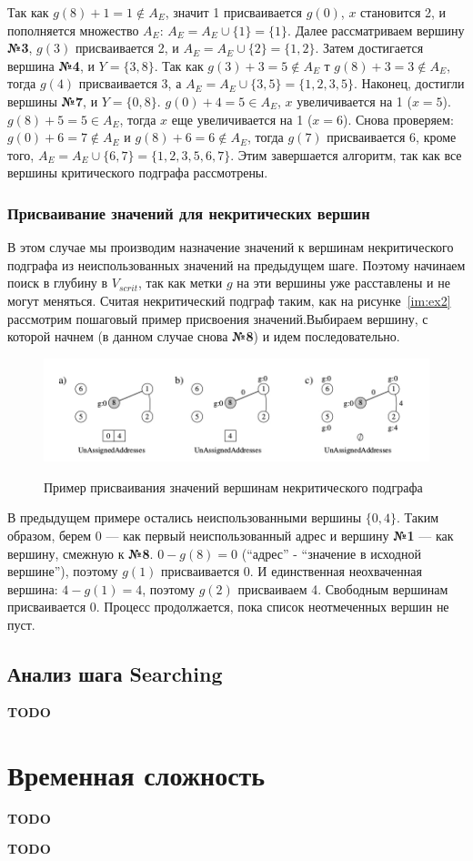 \documentclass[specialist,
               substylefile = spbu.rtx,
               subf,href,colorlinks=true, 12pt]{disser}
\begin{document}
Так как $g(8) + 1 = 1 \notin A_E$, значит 1 присваивается $g(0)$, $x$ становится 2, и пополняется множество $A_E$: $A_E = A_E \cup \{1\} = \{1\}$. Далее рассматриваем вершину \textbf{№3}, $g(3)$ присваивается 2,  и $A_E = A_E \cup \{2\} = \{1,2\}$. Затем достигается вершина \textbf{№4}, и $Y = \{3,8\}$. Так как $g(3) + 3 = 5 \notin A_E$ т $g(8) + 3 = 3 \notin A_E$, тогда $g(4)$ присваивается 3, а $A_E = A_E \cup \{3,5\} = \{1,2,3,5\}$. Наконец, достигли вершины \textbf{№7}, и $Y = \{0,8\}$. $g(0) + 4 = 5 \in A_E$, $x$ увеличивается на 1 ($x = 5$). $g(8) + 5 = 5 \in A_E$, тогда $x$ еще увеличивается на 1 ($x = 6$). Снова проверяем: $g(0) + 6 = 7 \notin A_E$ и $g(8) + 6 = 6 \notin A_E$, тогда $g(7)$ присваивается 6, кроме того, $A_E = A_E \cup \{6,7\} = \{1,2,3,5,6,7\}$. Этим завершается алгоритм, так как все вершины критического подграфа рассмотрены.

\subsubsection{Присваивание значений для некритических вершин}

В этом случае мы производим назначение значений к вершинам некритического подграфа из неиспользованных значений на предыдущем шаге. Поэтому начинаем поиск в глубину в $V_{scrit}$, так как метки $g$ на эти вершины уже расставлены и не могут меняться. Считая некритический подграф таким, как на рисунке~\ref{im:ex2} рассмотрим пошаговый пример присвоения значений.Выбираем вершину, с которой начнем (в данном случае снова \textbf{№8}) и идем последовательно.

\begin{figure}[h]
\begin{center}
\includegraphics[scale=0.35]{imgs/ex4.jpg}\label{im:ex4}
\caption{Пример присваивания значений вершинам некритического подграфа}
\end{center}
\end{figure}

В предыдущем примере остались неиспользованными вершины $\{0,4\}$. Таким образом, берем 0 --- как первый неиспользованный адрес и вершину \textbf{№1} --- как вершину, смежную к \textbf{№8}. $0 - g(8) = 0$ (``адрес'' - ``значение в исходной вершине''), поэтому $g(1)$ присваивается 0. И единственная неохваченная вершина: $4 - g(1) = 4$, поэтому $g(2)$ присваиваем 4. Свободным вершинам присваивается 0. Процесс продолжается, пока список неотмеченных вершин не пуст.

\subsection{Анализ шага Searching}

\textbf{TODO}

\newpage

\section{Временная сложность}

\textbf{TODO}

\conclusion

\textbf{TODO}
\end{document}
